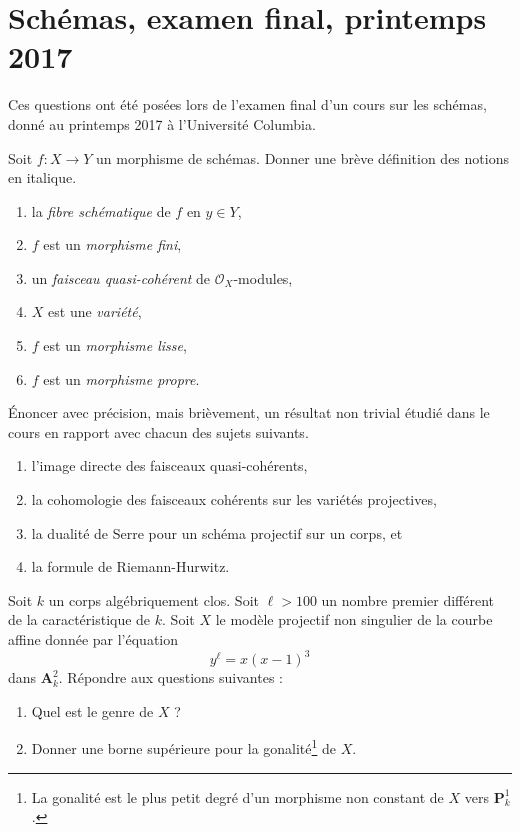 \section{Schémas, examen final, printemps 2017}
\label{section-final-exam-spring-2017}

\noindent
Ces questions ont été posées lors de l'examen final d'un cours sur les schémas,
donné au printemps 2017 à l'Université Columbia.

\begin{exercise}[Définitions]
\label{exercise-definitions-spring-2017}
Soit $f : X \to Y$ un morphisme de schémas.
Donner une brève définition des notions en italique.
\begin{enumerate}
\item la {\it fibre schématique} de $f$ en $y \in Y$,
\item $f$ est un {\it morphisme fini},
\item un {\it faisceau quasi-cohérent} de $\mathcal{O}_X$-modules,
\item $X$ est une {\it variété},
\item $f$ est un {\it morphisme lisse},
\item $f$ est un {\it morphisme propre}.
\end{enumerate}
\end{exercise}

\begin{exercise}[Théorèmes]
\label{exercise-results-spring-2017}
Énoncer avec précision, mais brièvement, un résultat non trivial étudié dans le cours
en rapport avec chacun des sujets suivants.
\begin{enumerate}
\item l'image directe des faisceaux quasi-cohérents,
\item la cohomologie des faisceaux cohérents sur les variétés projectives,
\item la dualité de Serre pour un schéma projectif sur un corps, et
\item la formule de Riemann-Hurwitz.
\end{enumerate}
\end{exercise}

\begin{exercise}
\label{exercise-compute-degree}
Soit $k$ un corps algébriquement clos.
Soit $\ell > 100$ un nombre premier différent de la
caractéristique de $k$. Soit $X$ le modèle projectif non singulier
de la courbe affine donnée par l'équation
$$
y^\ell = x(x - 1)^3
$$
dans $\mathbf{A}^2_k$. Répondre aux questions suivantes :
\begin{enumerate}
\item Quel est le genre de $X$ ?
\item Donner une borne supérieure pour la
gonalité\footnote{La gonalité est le plus petit degré d'un morphisme non constant
de $X$ vers $\mathbf{P}^1_k$.} de $X$.
\end{enumerate}
\end{exercise}

